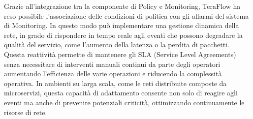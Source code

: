 Grazie all'integrazione tra la componente di Policy e Monitoring, TeraFlow ha reso possibile l'associazione delle condizioni di politica con gli allarmi del sistema di Monitoring.
In questo modo può implementare una gestione dinamica della rete, in grado di rispondere in tempo reale agli eventi che possono degradare la qualità del servizio, come l'aumento della latenza o la perdita di pacchetti. 
Questa reattività permette di mantenere gli SLA (Service Level Agreements) senza necessitare di interventi manuali continui da parte degli operatori aumentando l'efficienza delle varie operazioni e riducendo la complessità operativa.
In ambienti su larga scala, come le reti distribuite composte da microservizi, questa capacità di adattamento consente non solo di reagire agli eventi ma anche di prevenire potenziali criticità, ottimizzando continuamente le risorse di rete.


